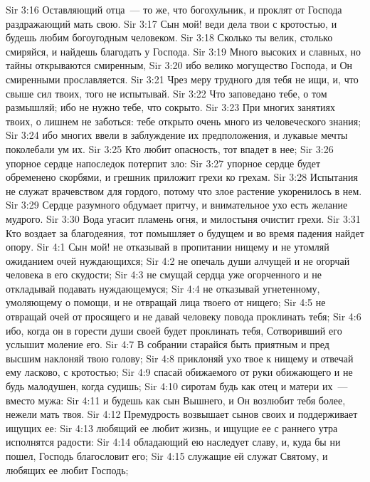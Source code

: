 \vs Sir 3:16 Оставляющий отца~--- то же, что богохульник, и проклят от Господа раздражающий мать свою.
\rsbpar\vs Sir 3:17 Сын мой! веди дела твои с кротостью, и будешь любим богоугодным человеком.
\vs Sir 3:18 Сколько ты велик, столько смиряйся, и найдешь благодать у Господа.
\vs Sir 3:19 Много высоких и славных, но тайны открываются смиренным,
\vs Sir 3:20 ибо велико могущество Господа, и Он смиренными прославляется.
\vs Sir 3:21 Чрез меру трудного для тебя не ищи, и, что свыше сил твоих, того не испытывай.
\vs Sir 3:22 Что заповедано тебе, о том размышляй; ибо не нужно тебе, что сокрыто.
\vs Sir 3:23 При многих занятиях твоих, о лишнем не заботься: тебе открыто очень много из человеческого знания;
\vs Sir 3:24 ибо многих ввели в заблуждение их предположения, и лукавые мечты поколебали ум их.
\vs Sir 3:25 Кто любит опасность, тот впадет в нее;
\vs Sir 3:26 упорное сердце напоследок потерпит зло:
\vs Sir 3:27 упорное сердце будет обременено скорбями, и грешник приложит грехи ко грехам.
\vs Sir 3:28 Испытания не служат врачевством для гордого, потому что злое растение укоренилось в нем.
\vs Sir 3:29 Сердце разумного обдумает притчу, и внимательное ухо есть желание мудрого.
\vs Sir 3:30 Вода угасит пламень огня, и милостыня очистит грехи.
\vs Sir 3:31 Кто воздает за благодеяния, тот помышляет о будущем и во время падения найдет опору.
\vs Sir 4:1 Сын мой! не отказывай в пропитании нищему и не утомляй ожиданием очей нуждающихся;
\vs Sir 4:2 не опечаль души алчущей и не огорчай человека в его скудости;
\vs Sir 4:3 не смущай сердца уже огорченного и не откладывай подавать нуждающемуся;
\vs Sir 4:4 не отказывай угнетенному, умоляющему о помощи, и не отвращай лица твоего от нищего;
\vs Sir 4:5 не отвращай очей от просящего и не давай человеку повода проклинать тебя;
\vs Sir 4:6 ибо, когда он в горести души своей будет проклинать тебя, Сотворивший его услышит моление его.
\vs Sir 4:7 В собрании старайся быть приятным и пред высшим наклоняй твою голову;
\vs Sir 4:8 приклоняй ухо твое к нищему и отвечай ему ласково, с кротостью;
\vs Sir 4:9 спасай обижаемого от руки обижающего и не будь малодушен, когда судишь;
\vs Sir 4:10 сиротам будь как отец и матери их~--- вместо мужа:
\vs Sir 4:11 и будешь как сын Вышнего, и Он возлюбит тебя более, нежели мать твоя.
\rsbpar\vs Sir 4:12 Премудрость возвышает сынов своих и поддерживает ищущих ее:
\vs Sir 4:13 любящий ее любит жизнь, и ищущие ее с раннего утра исполнятся радости:
\vs Sir 4:14 обладающий ею наследует славу, и, куда бы ни пошел, Господь благословит его;
\vs Sir 4:15 служащие ей служат Святому, и любящих ее любит Господь;
